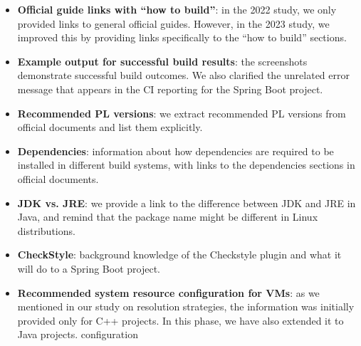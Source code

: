 \documentclass[10pt, conference]{IEEEtran}
\begin{document}
\begin{itemize}[leftmargin=*]
    \item \textbf{Official guide links with ``how to build''}: in the 2022 study, we only provided links to general official guides. However, in the 2023 study, we improved this by providing links specifically to the ``how to build'' sections.
    \item \textbf{Example output for successful build results}: the screenshots demonstrate successful build outcomes. We also clarified the unrelated error message that appears in the CI reporting for the Spring Boot project.
    \item \textbf{Recommended PL versions}: we extract recommended PL versions from official documents and list them explicitly.
    \item \textbf{Dependencies}: information about how dependencies are required to be installed in different build systems, with links to the dependencies sections in official documents.
    \item \textbf{JDK vs. JRE}: we provide a link to the difference between JDK and JRE in Java, and remind that the package name might be different in Linux distributions.
    \item \textbf{CheckStyle}: background knowledge of the Checkstyle plugin and what it will do to a Spring Boot project.
    \item \textbf{Recommended system resource configuration for VMs}: as we mentioned in our study on resolution strategies, the information was initially provided only for C++ projects. In this phase, we have also extended it to Java projects. configuration
\end{itemize}

\begin{table}[tbp]
  \centering
  \caption{Build Outcomes with intervention}
    \vspace{-.4cm}
  \label{tab:interverntion}%
\end{table}%
\end{document}
